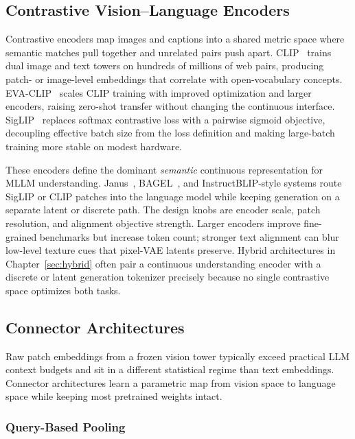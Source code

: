 \subsection{Contrastive Vision--Language Encoders}
\label{subsec:contrastive-enc}

Contrastive encoders map images and captions into a shared metric space where semantic matches pull together and unrelated pairs push apart. CLIP~\cite{radford2021clip} trains dual image and text towers on hundreds of millions of web pairs, producing patch- or image-level embeddings that correlate with open-vocabulary concepts. EVA-CLIP~\cite{sun2023evaclip} scales CLIP training with improved optimization and larger encoders, raising zero-shot transfer without changing the continuous interface. SigLIP~\cite{zhai2023siglip} replaces softmax contrastive loss with a pairwise sigmoid objective, decoupling effective batch size from the loss definition and making large-batch training more stable on modest hardware.

These encoders define the dominant \emph{semantic} continuous representation for MLLM understanding. Janus~\cite{DBLP:conf/cvpr/WuCWMLPLXYR025}, BAGEL~\cite{deng2025bagel}, and InstructBLIP-style systems route SigLIP or CLIP patches into the language model while keeping generation on a separate latent or discrete path. The design knobs are encoder scale, patch resolution, and alignment objective strength. Larger encoders improve fine-grained benchmarks but increase token count; stronger text alignment can blur low-level texture cues that pixel-VAE latents preserve. Hybrid architectures in Chapter~\ref{sec:hybrid} often pair a continuous understanding encoder with a discrete or latent generation tokenizer precisely because no single contrastive space optimizes both tasks.

\subsection{Connector Architectures}
\label{subsec:connectors}

Raw patch embeddings from a frozen vision tower typically exceed practical LLM context budgets and sit in a different statistical regime than text embeddings. Connector architectures learn a parametric map from vision space to language space while keeping most pretrained weights intact.

\subsubsection{Query-Based Pooling}
\label{subsubsec:qformer}

